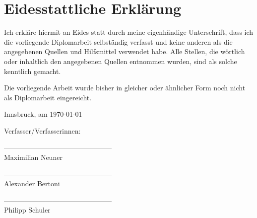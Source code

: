 \section*{Eidesstattliche Erklärung}

Ich erkläre hiermit an Eides statt durch meine eigenhändige Unterschrift, dass ich die vorliegende Diplomarbeit selbständig verfasst und keine anderen als die angegebenen Quellen und Hilfsmittel verwendet habe. Alle Stellen, die wörtlich oder inhaltlich den angegebenen Quellen entnommen wurden, sind als solche kenntlich gemacht.

Die vorliegende Arbeit wurde bisher in gleicher oder ähnlicher Form noch nicht als Diplomarbeit eingereicht.

Innsbruck, am \today

\vspace*{3cm}



Verfasser/Verfasserinnen:

\vspace*{2cm}


-----------------------------------------------\\
\hspace*{1.3cm}           Maximilian Neuner

\vspace*{2cm}


-----------------------------------------------\\
\hspace*{1.3cm}           Alexander Bertoni

\vspace*{2cm}


-----------------------------------------------\\
\hspace*{1.3cm}           Philipp Schuler



\newpage